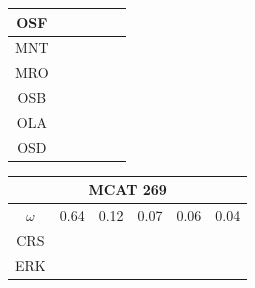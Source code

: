\documentclass[12pt]{article}
\begin{document}
\begin{landscape}
\begin{figure}
{\begin{minipage}[c]{0.3\textwidth}
\begin{tabular}{|c|c|c|c|c|c|}
        OSF&\cellcolor[HTML]{4DAF4A}&\cellcolor[HTML]{4DAF4A}&\cellcolor[HTML]{984EA3}&\cellcolor[HTML]{4DAF4A}&\cellcolor[HTML]{4DAF4A}\\ \hline %
        MNT&\cellcolor[HTML]{4DAF4A}&\cellcolor[HTML]{4DAF4A}&\cellcolor[HTML]{984EA3}&\cellcolor[HTML]{4DAF4A}&\cellcolor[HTML]{4DAF4A}\\ \hline %
        MRO&\cellcolor[HTML]{4DAF4A}&\cellcolor[HTML]{4DAF4A}&\cellcolor[HTML]{984EA3}&\cellcolor[HTML]{984EA3}&\cellcolor[HTML]{984EA3}\\ \hline %
        OSB&\cellcolor[HTML]{984EA3}&\cellcolor[HTML]{984EA3}&\cellcolor[HTML]{FF7F00}&\cellcolor[HTML]{FF7F00}&\cellcolor[HTML]{984EA3}\\ \hline %
        OLA&\cellcolor[HTML]{FF7F00}&\cellcolor[HTML]{984EA3}&\cellcolor[HTML]{FF7F00}&\cellcolor[HTML]{FF7F00}&\cellcolor[HTML]{984EA3}\\ \hline %
        OSD&\cellcolor[HTML]{FF7F00}&\cellcolor[HTML]{FF7F00}&\cellcolor[HTML]{FF7F00}&\cellcolor[HTML]{FF7F00}&\cellcolor[HTML]{FF7F00}\\ \hline %
\end{tabular}
\end{minipage}
\begin{minipage}[c]{0.3\textwidth}
\hspace*{-2.5cm}
\begin{tabular}{|c|c|c|c|c|c|}%
         \hline \multicolumn{6}{|c|}{MCAT 269} \\ \hline
         $\omega$&0.64&0.12&0.07&0.06&0.04\\ \hline %
        CRS&\cellcolor[HTML]{E41A1C}&\cellcolor[HTML]{E41A1C}&\cellcolor[HTML]{E41A1C}&\cellcolor[HTML]{E41A1C}&\cellcolor[HTML]{E41A1C}\\ \hline %
        ERK&\cellcolor[HTML]{E41A1C}&\cellcolor[HTML]{E41A1C}&\cellcolor[HTML]{E41A1C}&\cellcolor[HTML]{E41A1C}&\cellcolor[HTML]{E41A1C}\\ \hline %

\end{tabular}
\end{minipage}}
\end{figure}
\end{landscape}
\end{document}
